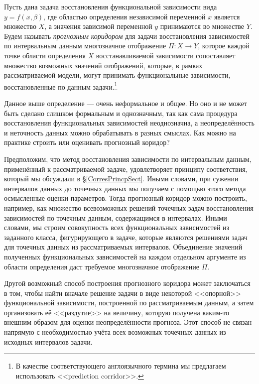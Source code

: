 \documentclass[a5paper,openany]{book}
\begin{document}
Пусть дана задача восстановления функциональной зависимости вида $y = f(x,\beta)$, 
где областью определения независимой переменной $x$ является множество $X$, а 
значения зависимой переменной $y$ принимаются во множестве $Y$. Будем называть 
\emph{прогнозным коридором} для задачи восстановления 
зависимостей по интервальным данным многозначное отображение $\varPi : X\to Y$, 
которое каждой точке области определения $X$ восстанавливаемой зависимости 
сопоставляет множество возможных значений отображений, которые, в рамках 
рассматриваемой модели, могут принимать функциональные зависимости, восстановленные 
по данным задачи.\footnote{В качестве соответствующего англоязычного термина 
мы предлагаем использовать <<prediction corridor>>.} 
  
Данное выше определение --- очень неформальное и общее. Но оно и не может быть сделано 
слишком формальным и однозначным, так как сама процедура восстановления функциональных 
зависимостей неоднозначна, а неопределённость и неточность данных можно обрабатывать 
в разных смыслах. Как можно на практике строить или оценивать прогнозный коридор?  
  
Предположим, что метод восстановления зависимости по интервальным данным, применённый 
к рассматриваемой задаче, удовлетворяет принципу соответствия, который мы обсуждали 
в \S\ref{CorresPrincpSect}. Иными словами, при сужении интервалов данных до точечных 
данных мы получаем с помощью этого метода осмысленные оценки параметров. Тогда 
прогнозный коридор можно построить, например, как множество всевозможных решений 
точечных задач восстановления зависимостей по точечным данным, содержащимся в интервалах. 
Иными словами, мы строим совокупность всех функциональных зависимостей из заданного 
класса, фигурирующего в задаче, которые являются решениями задач для точечных данных 
из рассматриваемых интервалов. Объединение значений полученных функциональных 
зависимостей на каждом отдельном аргументе из области определения даст требуемое 
многозначное отображение $\varPi$.  
  
Другой возможный способ построения прогнозного коридора может заключаться в том, чтобы 
найти вначале решение задачи в виде некоторой <<опорной>> функциональной зависимости, 
построенной по рассматриваемым данным, а затем организовать её <<раздутие>> на величину, 
которую получена каким-то внешним образом для оценки неопределённости прогноза. Этот 
способ не связан напрямую с необходимостью учёта всех возможных точечных данных 
из исходных интервалов задачи. 
  
\end{document}
